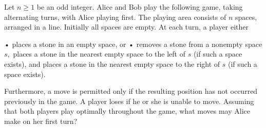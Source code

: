 Let $n\ge 1$ be an odd integer. Alice and Bob play the following game, taking alternating turns, with Alice playing first. The playing area consists of $n$ spaces, arranged in a line. Initially all spaces are empty. At each turn, a player either

• places a stone in an empty space, or
• removes a stone from a nonempty space $s,$ places a stone in the nearest empty space to the left of $s$ (if such a space exists), and places a stone in the nearest empty space to the right of $s$ (if such a space exists).

Furthermore, a move is permitted only if the resulting position has not occurred previously in the game. A player loses if he or she is unable to move. Assuming that both players play optimally throughout the game, what moves may Alice make on her first turn?